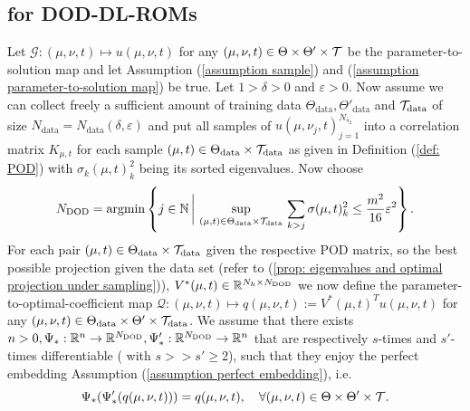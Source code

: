 \subsection{for DOD-DL-ROMs}



\begin{theorem} \label{theo: PAC bound for DOD-DL-ROM}
    Let $\mathcal{G}: (\mu, \nu, t) \mapsto u(\mu, \nu, t)$ for any $(\mu, \nu, t) \in \Theta \times \Theta' \times \mathcal{T}$ be the
    parameter-to-solution map and let Assumption (\ref{assumption sample}) and (\ref{assumption parameter-to-solution map}) be true. 
    Let $1 > \delta > 0$ and $\varepsilon > 0$.
    Now assume we can collect freely a sufficient amount of training data $\Theta_{\text{data}}, \Theta'_{\text{data}}$ and 
    $\mathcal{T}_{\text{data}}$ of size $N_{\text{data}} = 
    N_{\text{data}}(\delta, \varepsilon)$ and put all samples of $u(\mu, \nu_j, t)_{j=1}^{N_{s_2}}$ into a
    correlation matrix $K_{\mu, t}$ for each sample $(\mu, t) \in \Theta_{\text{data}} \times \mathcal{T}_{\text{data}}$ 
    as given in Definition (\ref{def: POD}) with $\sigma_k(\mu, t)_k^2$ being its sorted eigenvalues. 
    Now choose
    \begin{equation*}
        N_{\text{DOD}} = \operatorname{argmin} \left\{ j \in \mathbb{N} \, \bigg\vert \, 
        \sup\limits_{(\mu, t) \in \Theta_{\text{data}} \times \mathcal{T}_{\text{data}}} \,
        \sum_{k > j} \sigma(\mu, t)^2_k \leq \frac{m^2}{16} \varepsilon^2 \right\}.
    \end{equation*}
    For each pair $(\mu, t) \in \Theta_{\text{data}} \times \mathcal{T}_{\text{data}}$ given the respective POD matrix, so the 
    best possible projection given the data set (refer to (\ref{prop: eigenvalues and optimal projection under sampling})), 
    $V^*(\mu, t) \in \mathbb{R}^{N_h \times N_{\text{DOD}}}$ we now define the parameter-to-optimal-coefficient map 
    $\mathcal{Q}: (\mu, \nu, t) \mapsto q(\mu, \nu, t) := V^*(\mu, t)^T u(\mu, \nu, t)$ for 
    any $(\mu, \nu, t) \in \Theta_{\text{data}} \times \Theta' \times \mathcal{T}_{\text{data}}$. We assume that there exists 
    $n > 0, \Psi_* : \mathbb{R}^n \to \mathbb{R}^{N_{\text{DOD}}}, \Psi_*' : \mathbb{R}^{N_{\text{DOD}}} \to \mathbb{R}^n$ that are respectively $s$-times and
    $s'$-times differentiable ( with $s >> s' \geq 2$), such that they enjoy the perfect embedding 
    Assumption (\ref{assumption perfect embedding}), i.e. 
    \begin{equation*}
        \Psi_*(\Psi_*'(q(\mu, \nu, t))) = q(\mu, \nu, t), \quad \forall (\mu, \nu, t) \in \Theta \times \Theta' \times \Tcal.

\end{equation*}
\end{theorem}
